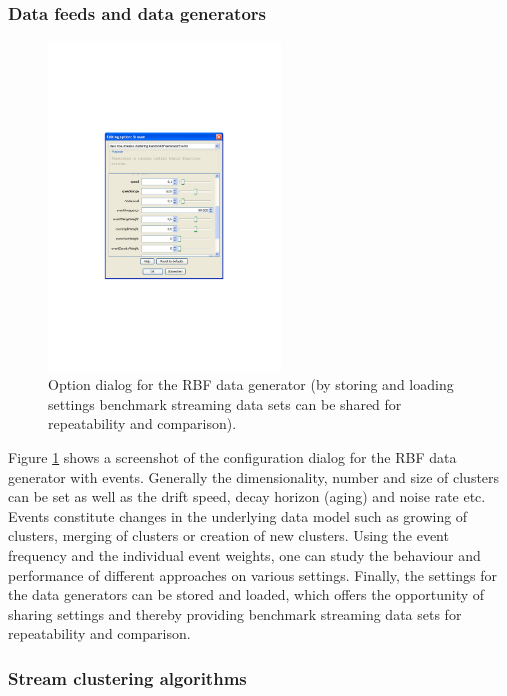 \documentclass[a4paper,12pt,twoside]{book}
\begin{document}
\subsubsection{Data feeds and data generators}
\label{sec:generators}

\begin{figure}[t]
	\centering
		\includegraphics[width=0.55\textwidth]{images/SetupTab}
	\caption{Option dialog for the RBF data generator (by storing and loading settings benchmark streaming data sets can be shared for repeatability and comparison).}
	\label{fig:framework}
\end{figure}
Figure \ref{fig:framework} shows a screenshot of the configuration dialog for the RBF data generator with events. 
Generally the dimensionality, number and size of clusters can be set as well as the drift speed, decay horizon (aging) and noise rate etc.
 Events constitute changes in the underlying data model such as growing of clusters, merging of clusters or creation of new clusters. 
Using the event frequency and the individual event weights, one can study the behaviour and performance of different approaches on various settings. 
Finally, the settings for the data generators can be stored and loaded, which offers the opportunity of sharing settings and thereby providing benchmark streaming data 
sets for repeatability and comparison. 

\subsubsection{Stream clustering algorithms}
\label{sec:algos}
\end{document}
